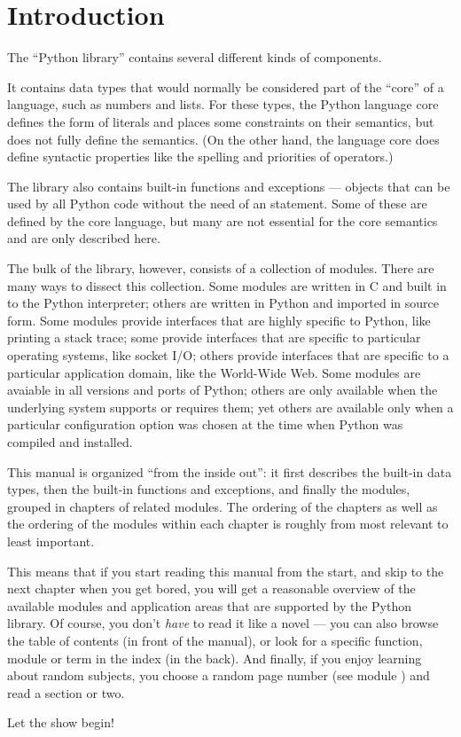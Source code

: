 \chapter{Introduction}

The ``Python library'' contains several different kinds of components.

It contains data types that would normally be considered part of the
``core'' of a language, such as numbers and lists.  For these types,
the Python language core defines the form of literals and places some
constraints on their semantics, but does not fully define the
semantics.  (On the other hand, the language core does define
syntactic properties like the spelling and priorities of operators.)

The library also contains built-in functions and exceptions ---
objects that can be used by all Python code without the need of an
 statement.  Some of these are defined by the core
language, but many are not essential for the core semantics and are
only described here.

The bulk of the library, however, consists of a collection of modules.
There are many ways to dissect this collection.  Some modules are
written in C and built in to the Python interpreter; others are
written in Python and imported in source form.  Some modules provide
interfaces that are highly specific to Python, like printing a stack
trace; some provide interfaces that are specific to particular
operating systems, like socket I/O; others provide interfaces that are
specific to a particular application domain, like the World-Wide Web.
Some modules are avaiable in all versions and ports of Python; others
are only available when the underlying system supports or requires
them; yet others are available only when a particular configuration
option was chosen at the time when Python was compiled and installed.

This manual is organized ``from the inside out'': it first describes
the built-in data types, then the built-in functions and exceptions,
and finally the modules, grouped in chapters of related modules.  The
ordering of the chapters as well as the ordering of the modules within
each chapter is roughly from most relevant to least important.

This means that if you start reading this manual from the start, and
skip to the next chapter when you get bored, you will get a reasonable
overview of the available modules and application areas that are
supported by the Python library.  Of course, you don't \emph{have} to
read it like a novel --- you can also browse the table of contents (in
front of the manual), or look for a specific function, module or term
in the index (in the back).  And finally, if you enjoy learning about
random subjects, you choose a random page number (see module
) and read a section or two.

Let the show begin!
